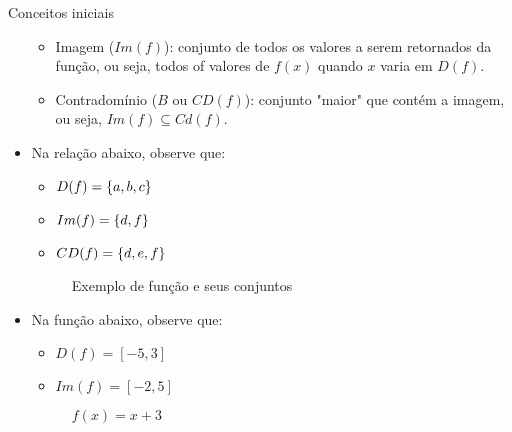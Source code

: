 \begin{frame}[allowframebreaks]{Conceitos iniciais}
\begin{itemize}
\begin{itemize}
        \item Imagem ($Im(f)$): conjunto de todos os valores a serem retornados da função, ou seja, todos of valores de $f(x)$ quando $x$ varia em $D(f)$.

        \item Contradomínio ($B$ ou $CD(f)$): conjunto "maior" que contém a imagem, ou seja, $Im(f) \subseteq Cd(f)$.
    \end{itemize}

    \skipframe

    \item Na relação abaixo, observe que:

    \begin{itemize}
        \item $D(f) = \left\{ a, b, c \right\}$
        \item $Im(f) = \left\{ d, f \right\}$
        \item $CD(f) = \left\{ d, e, f \right\}$
    \end{itemize}

    \begin{figure}
    \caption{Exemplo de função e seus conjuntos}
    \end{figure}

    \skipframe

    \item Na função abaixo, observe que:

    \begin{itemize}
        \item $D(f) = [-5, 3]$
        \item $Im(f) = [-2, 5]$
    \end{itemize}

    \begin{figure}
        \centering
        \caption{$f(x) = x + 3$}
    \end{figure}


\end{itemize}
\end{frame}
